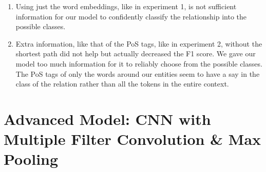 \documentclass[11pt]{article}
\begin{document}
\begin{enumerate}
\begin{enumerate}
	\item Using just the word embeddings, like in experiment 1, is not sufficient information for our model to confidently classify the relationship into the possible classes.
	
	\item Extra information, like that of the PoS tags, like in experiment 2, without the shortest path did not help but actually decreased the F1 score. We gave our model too much information for it to reliably choose from the possible classes. The PoS tags of only the words around our entities seem to have a say in the class of the relation rather than all the tokens in the entire context.
		
\end{enumerate}

\end{enumerate}
\section{Advanced Model: CNN with Multiple Filter Convolution \& Max Pooling}
\end{document}
